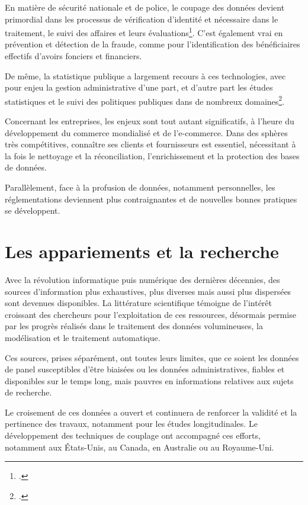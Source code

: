 \documentclass[a4paper,12pt,twoside]{book}
\begin{document}
			 En matière de sécurité nationale et de police, le coupage des données devient primordial dans les processus de vérification d'identité et nécessaire dans le traitement, le suivi des affaires et leurs évaluations\footcite{shortRecordLinkageRoad2016,sadinleGeneralizedFellegiSunter2013}. C'est également vrai en prévention et détection de la fraude, comme pour l'identification des bénéficiaires effectifs d'avoirs fonciers et financiers.
			 
			 De même, la statistique publique a largement recours à ces technologies, avec pour enjeu la gestion administrative d'une part, et d'autre part les études statistiques et le suivi des politiques publiques dans de nombreux domaines\footcites{OutilAppariementIdentifiants}.
			 
			 Concernant les entreprises, les enjeux sont tout autant significatifs, à l'heure du développement du commerce mondialisé et de l'e-commerce. Dans des sphères très compétitives, connaître ses clients et fournisseurs est essentiel, nécessitant à la fois le nettoyage et la réconciliation, l'enrichissement et la protection des bases de données.
			 
			 Parallèlement, face à la profusion de données, notamment personnelles, les réglementations deviennent plus contraignantes et de nouvelles bonnes pratiques se développent.
			 \pagebreak
			 
		\section{Les appariements et la recherche}
			 
			 Avec la révolution informatique puis numérique des dernières décennies, des sources d'information plus exhaustives, plus diverses mais aussi plus dispersées sont devenues disponibles. La littérature scientifique témoigne de l'intérêt croissant des chercheurs pour l'exploitation de ces ressources, désormais permise par les progrès réalisés dans le traitement des données volumineuses, la modélisation et le traitement automatique.
			 
			 Ces sources, prises séparément, ont toutes leurs limites, que ce soient les données de panel susceptibles d'être biaisées ou les données administratives, fiables et disponibles sur le temps long, mais pauvres en informations relatives aux sujets de recherche.
			 
			 Le croisement de ces données a ouvert et continuera de renforcer la validité et la pertinence des travaux, notamment pour les études longitudinales. Le développement des techniques de couplage ont accompagné ces efforts, notamment aux États-Unis, au Canada, en Australie ou au Royaume-Uni.
			 \newline
			 
\end{document}
